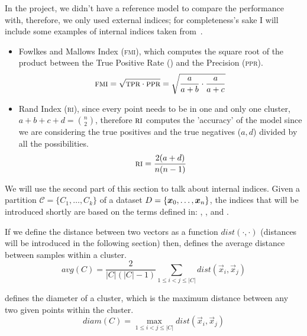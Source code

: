 In the project, we didn't have a reference model to compare the performance with, therefore, we only
used external indices; for completeness's sake I will include some examples of internal indices taken from~\cite{ZhouZhi-Hua2021ML}.

\begin{itemize}
	\item Fowlkes and Mallows Index (\textsc{fmi})\cite{Fowlkes1983}, which computes the square root of the
		product between the True Positive Rate (\tpr) and the Precision (\textsc{ppr}).
		\begin{equation*}
			\textsc{fmi} = \sqrt{\textsc{tpr} \cdot \textsc{ppr}} = \sqrt{\frac{a}{a + b} \cdot \frac{a}{a + c}}
		\end{equation*}
	\item Rand Index (\textsc{ri})\cite{Rand1971}, since every point needs to be in one and
		only one cluster, $a + b + c + d = \binom{n}{2}$, therefore $\textsc{ri}$ computes
		the 'accuracy' of the model since we are considering the true positives and the true negatives ($a, d$) divided by all the possibilities.
		\begin{equation*}
			\textsc{ri} = \frac{2(a + d)}{n(n - 1)}
		\end{equation*}
\end{itemize}

We will use the second part of this section to talk about internal indices. Given a partition
$\mathcal{C} = \{C_1, \ldots, C_k\}$ of a dataset $D = \{\boldsymbol{x}_0, \ldots, \boldsymbol{x}_n\}$, the indices that will
be introduced shortly are based on the terms defined in: , ,
 and .

If we define the distance between two vectors as a function $dist(\cdot, \cdot)$ (distances will be
introduced in the following section) then,  defines the average distance between samples within a cluster.
\begin{equation}
	\label{eq:cluster-avg}
	avg(C) = \frac{2}{|C|(|C| - 1)}\sum_{1 \leq i < j \leq |C|} dist(\vec{x}_i, \vec{x}_j)
\end{equation}

 defines the diameter of a cluster, which is the maximum distance between any
two given points within the cluster.
\begin{equation}
	\label{eq:cluster-diam}
	diam(C) = \max_{1 \leq i < j \leq |C|} dist(\vec{x}_i, \vec{x}_j)
\end{equation}

